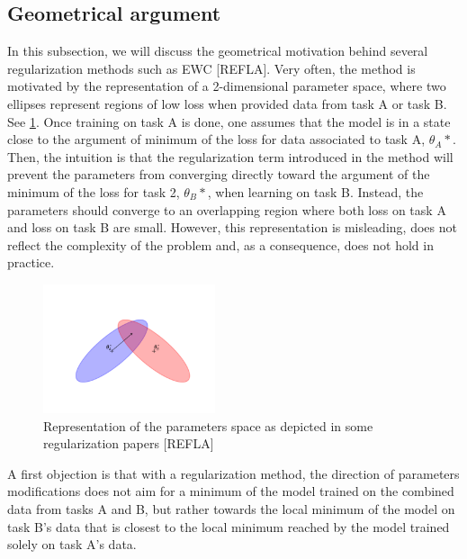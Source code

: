 \documentclass[11pt]{article}
\begin{document}
\subsection{Geometrical argument}


In this subsection, we will discuss the geometrical motivation behind several regularization methods such as EWC [REFLA]. Very often, the method is motivated by the representation of a 2-dimensional parameter space, where two ellipses represent regions of low loss when provided data from task A or task B. See \ref{fig:ellipses_EWC}. Once training on task A is done, one assumes that the model is in a state close to the argument of minimum of the loss for data associated to task A, $\theta_A*$. Then, the intuition is that the regularization term introduced in the method will prevent the parameters from converging directly toward the argument of the minimum of the loss for task 2, $\theta_B*$, when learning on task B. Instead, the parameters should converge to an overlapping region where both loss on task A and loss on task B are small. However, this representation is misleading, does not reflect the complexity of the problem and, as a consequence, does not hold in practice. 

\begin{figure}
    \centering
    \includegraphics[width=0.45\textwidth]{images/ellipse_overlap.png}
    \caption{Representation of the parameters space as depicted in some regularization papers [REFLA]}
    \label{fig:ellipses_EWC}
\end{figure}

\vspace{2mm}
\noindent
A first objection is that with a regularization method, the direction of parameters modifications does not aim for a minimum of the model trained on the combined data from tasks A and B, but rather towards the local minimum of the model on task B's data that is closest to the local minimum reached by the model trained solely on task A's data.
\end{document}

